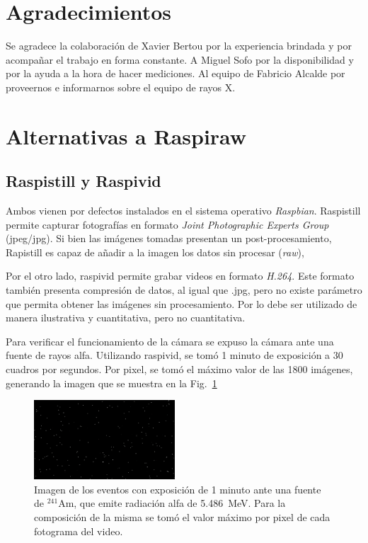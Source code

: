\documentclass[twoside,twocolumn]{article}
\begin{document}
  
  

  \section*{Agradecimientos}
    Se agradece la colaboración de Xavier Bertou por la experiencia brindada y por
    acompañar el trabajo en forma constante.
    A Miguel Sofo por la disponibilidad y por la ayuda a la hora de hacer mediciones.
    Al equipo de Fabricio Alcalde por proveernos e informarnos sobre el equipo de rayos X.

  \clearpage
  \appendix
  \section{Alternativas a Raspiraw}\label{sec:ap_alternatives}
  
  \subsection{Raspistill y Raspivid}
    Ambos vienen por defectos instalados en el sistema operativo \emph{Raspbian}.
    Raspistill permite capturar fotografías en formato \emph{Joint Photographic Experts Group} (jpeg/jpg).
    Si bien las imágenes tomadas presentan un post-procesamiento, Rapistill es capaz de añadir a la imagen los datos sin procesar (\emph{raw}),

    Por el otro lado, raspivid permite grabar videos en formato \emph{H.264}.
    Este formato también presenta compresión de datos, al igual que .jpg, pero no existe parámetro que permita obtener las imágenes sin procesamiento.
    Por lo debe ser utilizado de manera ilustrativa y cuantitativa, pero no cuantitativa.

    Para verificar el funcionamiento de la cámara se expuso la cámara ante una fuente de rayos alfa.
    Utilizando raspivid, se tomó 1 minuto de exposición a 30 cuadros por segundos.
    Por pixel, se tomó el máximo valor de las 1800 imágenes, generando la imagen que se muestra en la Fig.~\ref{fig:raspivid}

    \begin{figure}[h]
      \includegraphics[width=0.47\textwidth]{figures/Alpha_1m.png}
      \caption{Imagen de los eventos con exposición de 1 minuto ante una fuente de $^{241}$Am,
      que emite radiación alfa de \SI{5.486}{\mega\eV}.
      Para la composición de la misma se tomó el valor máximo por pixel de cada fotograma del video.
      }
      \label{fig:raspivid}
    \end{figure}
\end{document}
